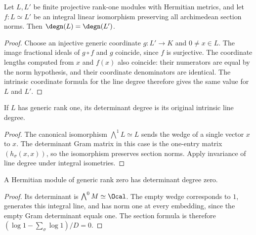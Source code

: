 \begin{lemma}
\label{lem:line-degree-isometry}
\leanok
Let $L,L'$ be finite projective rank-one modules with Hermitian metrics,
and let $f:L\simeq L'$ be an integral linear isomorphism preserving all
archimedean section norms. Then $\degn(L)=\degn(L')$.
\end{lemma}
\begin{proof}
Choose an injective generic coordinate $g:L'\to K$ and $0\ne x\in L$.
The image fractional ideals of $g\circ f$ and $g$ coincide, since $f$
is surjective. The coordinate lengths computed from $x$ and $f(x)$ also
coincide: their numerators are equal by the norm hypothesis, and their
coordinate denominators are identical. The intrinsic coordinate formula
for the line degree therefore gives the same value for $L$ and $L'$.
\end{proof}

\begin{lemma}
\label{lem:degree-rank-one}
\leanok
If $L$ has generic rank one, its determinant degree is its original
intrinsic line degree.
\end{lemma}
\begin{proof}
The canonical isomorphism $\bigwedge^1 L\simeq L$ sends the wedge of a
single vector $x$ to $x$. The determinant Gram matrix in this case is
the one-entry matrix $(h_\sigma(x,x))$, so the isomorphism preserves
section norms. Apply invariance of line degree under integral isometries.
\end{proof}

\begin{lemma}
\label{lem:degree-rank-zero}
\leanok
A Hermitian module of generic rank zero has determinant degree zero.
\end{lemma}
\begin{proof}
Its determinant is $\bigwedge^0 M\simeq\Ocal$. The empty wedge corresponds
to $1$, generates this integral line, and has norm one at every embedding,
since the empty Gram determinant equals one. The section formula is therefore
$(\log 1-\sum_\sigma\log 1)/D=0$.
\end{proof}

